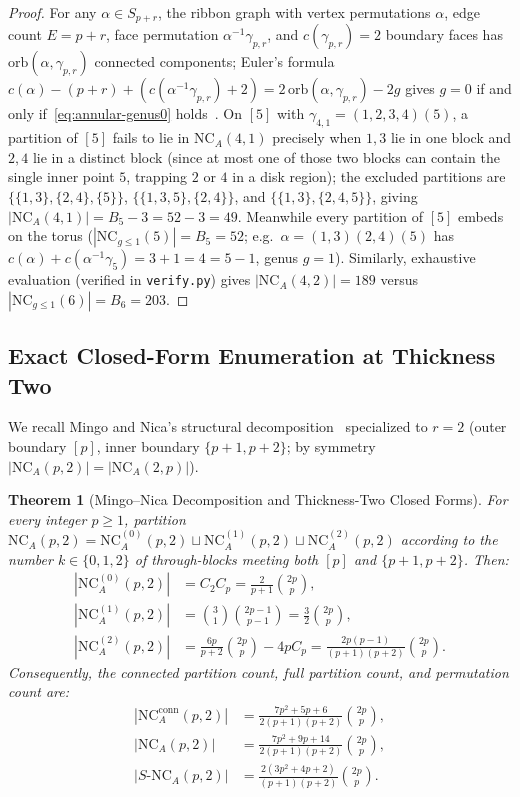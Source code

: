 \documentclass[11pt,a4paper]{article}
\newtheorem{theorem}{Theorem}[section]
\theoremstyle{definition}
\theoremstyle{remark}
\newcommand{\NCA}{\mathrm{NC}_A}
\newcommand{\SNCA}{S\text{-}\mathrm{NC}_A}
\newcommand{\NC}{\mathrm{NC}}
\newcommand{\orb}{\mathrm{orb}}
\begin{document}
\begin{proof}
For any $\alpha \in S_{p+r}$, the ribbon graph with vertex permutations $\alpha$, edge count $E = p+r$, face permutation $\alpha^{-1}\gamma_{p,r}$, and $c(\gamma_{p,r}) = 2$ boundary faces has $\orb(\alpha,\gamma_{p,r})$ connected components; Euler's formula $c(\alpha) - (p+r) + (c(\alpha^{-1}\gamma_{p,r}) + 2) = 2\,\orb(\alpha,\gamma_{p,r}) - 2g$ gives $g = 0$ if and only if~\eqref{eq:annular-genus0} holds~\cite{Biane1997,MingoNica2004}. On $[5]$ with $\gamma_{4,1} = (1,2,3,4)(5)$, a partition of $[5]$ fails to lie in $\NCA(4,1)$ precisely when $1,3$ lie in one block and $2,4$ lie in a distinct block (since at most one of those two blocks can contain the single inner point $5$, trapping $2$ or $4$ in a disk region); the excluded partitions are $\{\{1,3\},\{2,4\},\{5\}\}$, $\{\{1,3,5\},\{2,4\}\}$, and $\{\{1,3\},\{2,4,5\}\}$, giving $|\NCA(4,1)| = B_5 - 3 = 52 - 3 = 49$. Meanwhile every partition of $[5]$ embeds on the torus ($|\NC_{g \le 1}(5)| = B_5 = 52$; e.g.\ $\alpha = (1,3)(2,4)(5)$ has $c(\alpha) + c(\alpha^{-1}\gamma_5) = 3 + 1 = 4 = 5 - 1$, genus $g = 1$). Similarly, exhaustive evaluation (verified in \texttt{verify.py}) gives $|\NCA(4,2)| = 189$ versus $|\NC_{g \le 1}(6)| = B_6 = 203$.
\end{proof}

\subsection{Exact Closed-Form Enumeration at Thickness Two}

We recall Mingo and Nica's structural decomposition~\cite[Sections~4 and~6]{MingoNica2004} specialized to $r = 2$ (outer boundary $[p]$, inner boundary $\{p+1,p+2\}$; by symmetry $|\NCA(p,2)| = |\NCA(2,p)|$).

\begin{theorem}[Mingo--Nica Decomposition and Thickness-Two Closed Forms]\label{thm:mingo-nica-counts}
For every integer $p \ge 1$, partition $\NCA(p,2) = \NCA^{(0)}(p,2) \sqcup \NCA^{(1)}(p,2) \sqcup \NCA^{(2)}(p,2)$ according to the number $k \in \{0,1,2\}$ of through-blocks meeting both $[p]$ and $\{p+1,p+2\}$. Then:
\begin{align}
  |\NCA^{(0)}(p,2)| &= C_2 C_p = \frac{2}{p+1}\binom{2p}{p}, \label{eq:strata0}\\
  |\NCA^{(1)}(p,2)| &= \binom{3}{1}\binom{2p-1}{p-1} = \frac{3}{2}\binom{2p}{p}, \label{eq:strata1}\\
  |\NCA^{(2)}(p,2)| &= \frac{6p}{p+2}\binom{2p}{p} - 4p C_p = \frac{2p(p-1)}{(p+1)(p+2)}\binom{2p}{p}. \label{eq:strata2}
\end{align}
Consequently, the connected partition count, full partition count, and permutation count are:
\begin{align}
  |\NCA^{\mathrm{conn}}(p,2)| &= \frac{7p^2 + 5p + 6}{2(p+1)(p+2)}\binom{2p}{p}, \label{eq:conn-count}\\
  |\NCA(p,2)| &= \frac{7p^2 + 9p + 14}{2(p+1)(p+2)}\binom{2p}{p}, \label{eq:total-count}\\
  |\SNCA(p,2)| &= \frac{2(3p^2 + 4p + 2)}{(p+1)(p+2)}\binom{2p}{p}. \label{eq:perm-count}
\end{align}
\end{theorem}
\end{document}
